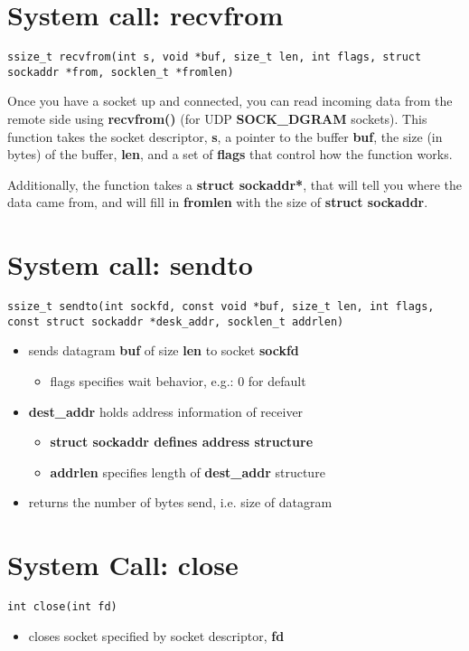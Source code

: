 \documentclass{report}
\begin{document}
\section{System call: recvfrom}
\begin{verbatim}
ssize_t recvfrom(int s, void *buf, size_t len, int flags, struct sockaddr *from, socklen_t *fromlen)
\end{verbatim}
Once you have a socket up and connected, you can read incoming data from the remote side using \textbf{recvfrom()} (for UDP \textbf{SOCK\_DGRAM} sockets).
\bigbreak \noindent
This function takes the socket descriptor, \textbf{s}, a pointer to the buffer \textbf{buf}, the size (in bytes) of the buffer, \textbf{len}, and a set of \textbf{flags} that control how the function works.  \vspace{2mm}

\noindent Additionally, the function takes a \textbf{struct sockaddr*}, that will tell you where the data came from, and will fill in \textbf{fromlen} with the size of \textbf{struct sockaddr}.
\section{System call: sendto}
\begin{verbatim}
ssize_t sendto(int sockfd, const void *buf, size_t len, int flags, const struct sockaddr *desk_addr, socklen_t addrlen)
\end{verbatim}
\begin{itemize}
  \item sends datagram \textbf{buf} of size \textbf{len} to socket \textbf{sockfd}
    \begin{itemize}[label=$\circ$]
    will wait if there is no ready receiver
    \item flags specifies wait behavior, e.g.: 0 for default
    \end{itemize}
  \item \textbf{dest\_addr} holds address information of receiver
   \begin{itemize}[label=$\circ$]
     \item \textbf{struct sockaddr defines address structure}
   \item \textbf{addrlen} specifies length of \textbf{dest\_addr} structure
   \end{itemize} 
 \item returns the number of bytes send, i.e. size of datagram
\end{itemize}
\section{System Call: close}
\begin{verbatim}
int close(int fd)
\end{verbatim}
\begin{itemize}
  \item closes socket specified by socket descriptor, \textbf{fd}
\end{itemize}
\end{document}
